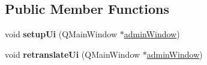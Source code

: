 \subsection*{Public Member Functions}
\begin{DoxyCompactItemize}
\item 
\mbox{\label{class_ui__admin_window_a7057c6fc6718b89da0d1ef1e8feb5e62}} 
void {\bfseries setup\+Ui} (Q\+Main\+Window $\ast$\hyperlink{classadmin_window}{admin\+Window})
\item 
\mbox{\label{class_ui__admin_window_ac7535c816a61f0c9b55d8d8fbe774130}} 
void {\bfseries retranslate\+Ui} (Q\+Main\+Window $\ast$\hyperlink{classadmin_window}{admin\+Window})
\end{DoxyCompactItemize}
